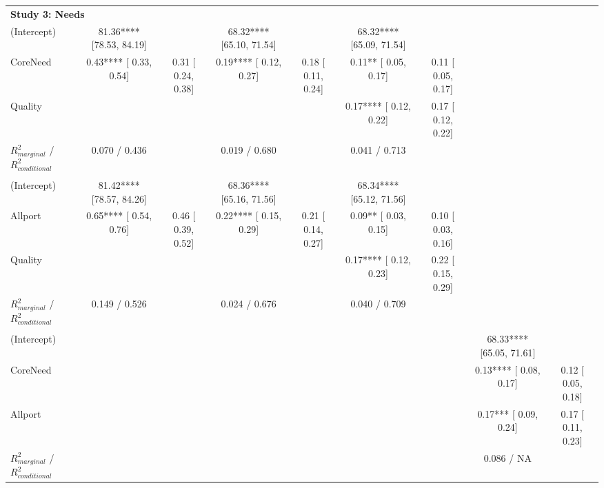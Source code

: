 \begin{landscape}
\begin{table}
\begin{minipage}[t][\textheight][t]{\textwidth}
{\begin{tabular}[t]{lcccccccc}
\multicolumn{9}{l}{\textbf{Study 3: Needs}}\\
\hspace{1em}(Intercept) & 81.36**** [78.53, 84.19] &  & 68.32**** [65.10, 71.54] &  & 68.32**** [65.09, 71.54] &  &  & \\
\hspace{1em}CoreNeed & 0.43**** [ 0.33,  0.54] & 0.31 [ 0.24, 0.38] & 0.19**** [ 0.12,  0.27] & 0.18 [ 0.11, 0.24] & 0.11** [ 0.05,  0.17] & 0.11 [ 0.05,  0.17] &  & \\
\hspace{1em}Quality &  &  &  &  & 0.17**** [ 0.12,  0.22] & 0.17 [ 0.12,  0.22] &  & \\
\hspace{1em}$R^2_{marginal}$ / $R^2_{conditional}$ & 0.070 / 0.436 &  & 0.019 / 0.680 &  & 0.041 / 0.713 &  &  & \\
\addlinespace[0.3em]
\multicolumn{9}{l}{\textbf{Study 3: Allport}}\\
\hspace{1em}(Intercept) & 81.42**** [78.57, 84.26] &  & 68.36**** [65.16, 71.56] &  & 68.34**** [65.12, 71.56] &  &  & \\
\hspace{1em}Allport & 0.65**** [ 0.54,  0.76] & 0.46 [ 0.39, 0.52] & 0.22**** [ 0.15,  0.29] & 0.21 [ 0.14, 0.27] & 0.09** [ 0.03,  0.15] & 0.10 [ 0.03, 0.16] &  & \\
\hspace{1em}Quality &  &  &  &  & 0.17**** [ 0.12,  0.23] & 0.22 [ 0.15, 0.29] &  & \\
\hspace{1em}$R^2_{marginal}$ / $R^2_{conditional}$ & 0.149 / 0.526 &  & 0.024 / 0.676 &  & 0.040 / 0.709 &  &  & \\
\addlinespace[0.3em]
\multicolumn{9}{l}{\textbf{Study 3: Needs \& Allport}}\\
\hspace{1em}(Intercept) &  &  &  &  &  &  & 68.33**** [65.05, 71.61] & \\
\hspace{1em}CoreNeed &  &  &  &  &  &  & 0.13**** [ 0.08,  0.17] & 0.12 [ 0.05, 0.18]\\
\hspace{1em}Allport &  &  &  &  &  &  & 0.17*** [ 0.09,  0.24] & 0.17 [ 0.11, 0.23]\\
\hspace{1em}$R^2_{marginal}$ / $R^2_{conditional}$ &  &  &  &  &  &  & 0.086 / NA & \\
\bottomrule
\end{tabular}}
\end{minipage}
\end{table}
\end{landscape}
